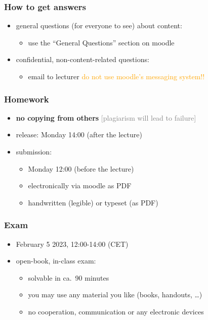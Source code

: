 \documentclass[fleqn,10pt,serif,xcolor=svgnames,xcolor=table,aspectratio=169,handout]{beamer}
\newcommand{\mycom}[1]{\hfill {\mygray{[#1]}}}
\newcommand{\mygray}[1]{\textcolor{gray}{#1}}
\begin{document}
\begin{frame}
  \frametitle{How to get answers}
  \begin{itemize}
    \item general questions (for everyone to see) about content:
    \begin{itemize}
      \item use the ``General Questions'' section on moodle
    \end{itemize}
    \item confidential, non-content-related questions:
    \begin{itemize}
      \item email to lecturer \hfill \textcolor{orange}{do not use moodle's messaging system!!}
    \end{itemize}
  \end{itemize}
\end{frame}

\begin{frame}
  \frametitle{Homework}
  \begin{itemize}
    \item \textbf{no copying from others} \hfill \mycom{plagiarism will lead to failure}
    \item release: Monday 14:00 (after the lecture)
    \item submission:
    \begin{itemize}
      \item Monday 12:00 (before the lecture)
      \item electronically via moodle as PDF
      \item handwritten (legible) or typeset (as PDF)
    \end{itemize}
  \end{itemize}
\end{frame}

\begin{frame}
  \frametitle{Exam}
  \begin{itemize}
    \item February 5 2023, 12:00-14:00 (CET)
    \item open-book, in-class exam:
    \begin{itemize}
      \item solvable in ca.~90 minutes
      \item you may use any material you like (books, handouts, \dots)
      \item no cooperation, communication or any electronic devices
    \end{itemize}
  \end{itemize}
\end{frame}
\end{document}
